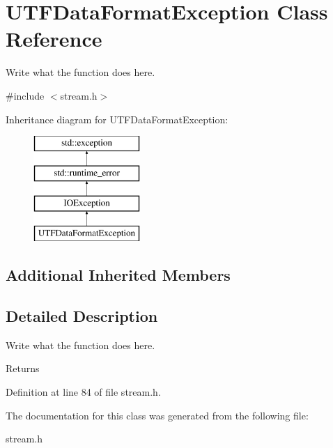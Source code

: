 \hypertarget{classUTFDataFormatException}{\section{U\+T\+F\+Data\+Format\+Exception Class Reference}
\label{classUTFDataFormatException}
}


Write what the function does here.  




{\ttfamily \#include $<$stream.\+h$>$}

Inheritance diagram for U\+T\+F\+Data\+Format\+Exception\+:\begin{figure}[H]
\begin{center}
\leavevmode
\includegraphics[height=4.000000cm]{classUTFDataFormatException}
\end{center}
\end{figure}
\subsection*{Additional Inherited Members}


\subsection{Detailed Description}
Write what the function does here. 

\begin{DoxyReturn}{Returns}

\end{DoxyReturn}


Definition at line 84 of file stream.\+h.



The documentation for this class was generated from the following file\+:\begin{DoxyCompactItemize}
\item 
stream.\+h\end{DoxyCompactItemize}
